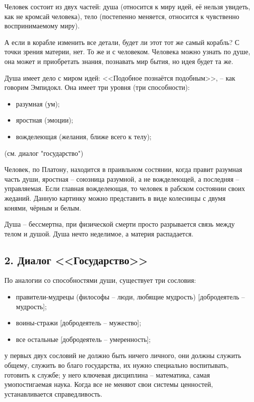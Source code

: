 \documentclass[a4paper, 12pt]{book} %
\begin{document}
Человек состоит из двух частей: душа (относится к миру идей, её нельзя увидеть, как не кромсай человека), тело (постепенно меняется, относится к чувственно воспринимаемому миру).

А если в корабле изменить все детали, будет ли этот тот же самый корабль? С точки зрения материи, нет. То же и с человеком. Человека можно узнать по душе, она может и приобретать знания, познавать мир бытия, но идея будет та же.

Душа имеет дело с миром идей: <<Подобное познаётся подобным>>, -- как говорим Эмпидокл. Она имеет три уровня (три способности):
\begin{itemize}
\item разумная (ум);
\item яростная (эмоции); 
\item вожделеющая (желания, ближе всего  к телу);
\end{itemize}
(см. диалог "государство")

Человек, по Платону, находится в праивльном состянии, когда правит разумная часть души, яростная -- союзница разумной, а не вожделеющей, а последняя -- управляемая.
Если главная вожделеющая, то человек в рабском состоянии своих жеданий.
Данную картинку можно представить в виде колесницы с двумя конями, чёрным и белым.

Душа -- бессмертна, при физической смерти просто разрывается связь между телом и душой. Душа нечто неделимое, а материя распадается.

\subsection*{2. Диалог <<Государство>>}
По аналогии со способностями души, существует три сословия:
\begin{itemize}
\item правители-мудрецы (философы -- люди, любящие мудрость) [добродеятель -- мудрость];
\item воины-стражи [добродеятель -- мужество];
\item все остальные [добродеятель -- умеренность];
\end{itemize} 

у первых двух сословий не должно быть ничего личного, они должны служить общему, служить во благо государства, их нужно специально воспитывать, готовить к службе;
у него ключевая дисциплина -- математика, самая умопостигаемая наука. 
Когда все не меняют свои системы ценностей, устанавливается справедливость.
\end{document}
